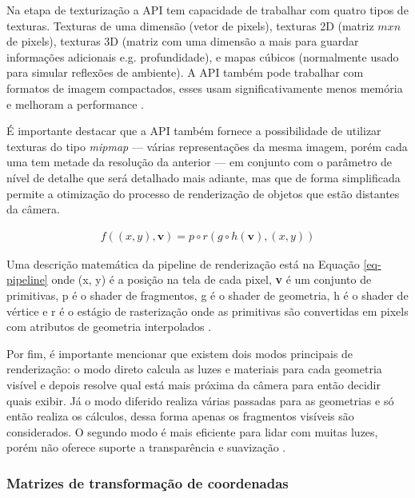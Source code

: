 Na etapa de texturização a API tem capacidade de trabalhar com quatro tipos de texturas. Texturas de uma dimensão (vetor de pixels), texturas 2D (matriz $ mxn $ de pixels), texturas 3D (matriz com uma dimensão a mais para guardar informações adicionais e.g. profundidade), e mapas cúbicos (normalmente usado para simular reflexões de ambiente). A API também pode trabalhar com formatos de imagem compactados, esses usam significativamente menos memória e melhoram a performance \cite{GLSLBook}.

É importante destacar que a API também fornece a possibilidade de utilizar texturas do tipo \textit{mipmap} --- várias representações da mesma imagem, porém cada uma tem metade da resolução da anterior --- em conjunto com o parâmetro de nível de detalhe que será detalhado mais adiante, mas que de forma simplificada permite a otimização do processo de renderização de objetos que estão distantes da câmera. 

\begin{equation} \label{eq-pipeline}
	\begin{aligned}
		f((x,y), \mathbf{v})=p \circ r(g \circ h(\mathbf{v}), (x,y)) 
	\end{aligned}
\end{equation}

Uma descrição matemática da pipeline de renderização está na Equação \ref{eq-pipeline} onde (x, y) é a posição na tela de cada pixel, \textbf{v} é um conjunto de primitivas, p é o shader de fragmentos, g é o shader de geometria, h é o shader de vértice e r é o estágio de rasterização onde as primitivas são convertidas em pixels com atributos de geometria interpolados \cite{wang2014auto}.

Por fim, é importante mencionar que existem dois modos principais de renderização: o modo direto calcula as luzes e materiais para cada geometria visível e depois resolve qual está mais próxima da câmera para então decidir quais exibir. Já o modo diferido realiza várias passadas para as geometrias e só então realiza os cálculos, dessa forma apenas os fragmentos visíveis são considerados. O segundo modo é mais eficiente para lidar com muitas luzes, porém não oferece suporte a transparência e suavização \cite{vsmid2017comparison}.

\subsubsection{Matrizes de transformação de coordenadas}
\label{sec:matrizes-transformacao-coordenadas}

